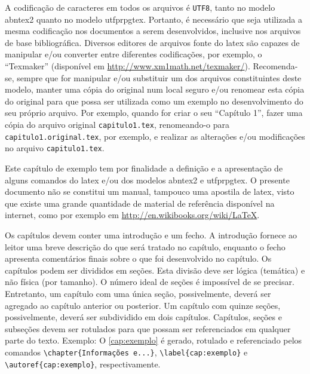 A codificação de caracteres em todos os arquivos é \texttt{UTF8}, tanto no modelo \gls{abntex2} quanto no modelo \gls{utfprpgtex}. Portanto, é necessário que seja utilizada a mesma codificação nos documentos a serem desenvolvidos, inclusive nos arquivos de base bibliográfica. Diversos editores de arquivos fonte do \gls{latex} são capazes de manipular e/ou converter entre diferentes codificações, por exemplo, o ``Texmaker'' (disponível em \url{http://www.xm1math.net/texmaker/}). Recomenda-se, sempre que for manipular e/ou substituir um dos arquivos constituintes deste modelo, manter uma cópia do original num local seguro e/ou renomear esta cópia do original para que possa ser utilizada como um exemplo no desenvolvimento do seu próprio arquivo. Por exemplo, quando for criar o seu ``Capítulo 1'', fazer uma cópia do arquivo original \texttt{capitulo1.tex}, renomeando-o para \texttt{capitulo1.original.tex}, por exemplo, e realizar as alterações e/ou modificações no arquivo \texttt{capitulo1.tex}.

Este capítulo\label{errata:capitulo} de exemplo tem por finalidade a definição e a apresentação de alguns comandos do \gls{latex} e/ou dos modelos \gls{abntex2} e \gls{utfprpgtex}. O presente documento não se constitui um manual, tampouco uma apostila de \gls{latex}, visto que existe uma grande quantidade de material de referência disponível na internet, como por exemplo em \url{http://en.wikibooks.org/wiki/LaTeX}.

Os capítulos devem conter uma introdução e um fecho. A introdução fornece ao leitor uma breve descrição do que será tratado no capítulo, enquanto o fecho apresenta comentários finais sobre o que foi desenvolvido no capítulo. Os capítulos podem ser divididos em seções\label{errata:secao}. Esta divisão deve ser lógica (temática) e não física (por tamanho). O número ideal de seções é impossível de se precisar. Entretanto, um capítulo com uma única seção, possivelmente, deverá ser agregado ao capítulo anterior ou posterior. Um capítulo com quinze seções, possivelmente, deverá ser subdividido em dois capítulos. Capítulos, seções e subseções\label{errata:subsecao} devem ser rotulados para que possam ser referenciados em qualquer parte do texto. Exemplo: O \autoref{cap:exemplo} é gerado, rotulado e referenciado pelos comandos \verb|\chapter{Informações e...}|, \verb|\label{cap:exemplo}| e \verb|\autoref{cap:exemplo}|, respectivamente.

